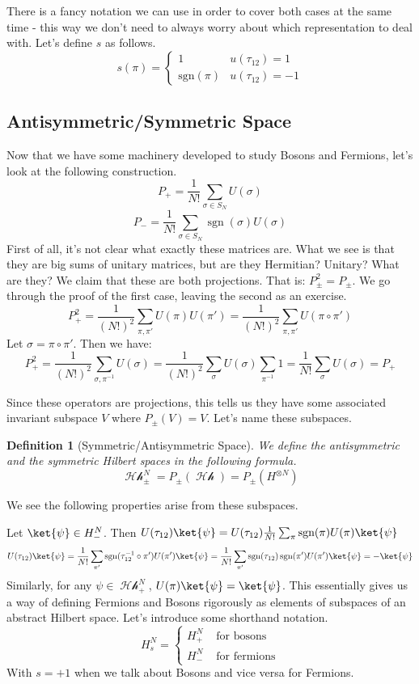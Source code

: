 \documentclass{article}
\DeclareMathOperator{\Hh}{\mathcal{Hh}}
\DeclareMathOperator{\sgn}{\textrm{sgn}}
\newtheorem{defn}{Definition}
\begin{document}
There is a fancy notation we can use in order to cover both cases at the same time - this way we don't need to always worry about which representation to deal with. Let's define $s$ as follows.
\[s(\pi)=\begin{cases}1 & u(\tau_{12})=1\\
\textrm{sgn}(\pi) & u(\tau_{12})=-1
\end{cases}\]
\pagebreak

\subsection{Antisymmetric/Symmetric Space}
Now that we have some machinery developed to study Bosons and Fermions, let's look at the following construction.
\begin{equation}
P_{+} = \frac{1}{N!}\sum_{\sigma \in S_N} U(\sigma)
\end{equation}
\begin{equation}
P_{-} = \frac{1}{N!}\sum_{\sigma \in S_N} \sgn(\sigma) U(\sigma)
\end{equation}
First of all, it's not clear what exactly these matrices are. What we see is that they are big sums of unitary matrices, but are they Hermitian? Unitary? What are they? We claim that these are both projections. That is: $P_{\pm}^2 = P_{\pm}$. We go through the proof of the first case, leaving the second as an exercise.
\[P_+^2 = \frac{1}{(N!)^2} \sum_{\pi,\pi'}U(\pi)U(\pi') = \frac{1}{(N!)^2}\sum_{\pi,\pi'} U(\pi \circ \pi')\]
Let $\sigma = \pi\circ \pi'$. Then we have:
\[P_+^2 = \frac{1}{(N!)^2} \sum_{\sigma,\pi^{-1}}U(\sigma) = \frac{1}{(N!)^2}\sum_{\sigma}U(\sigma) \sum_{\pi^{-1}}1 = \frac{1}{N!}\sum_{\sigma} U(\sigma) = P_+\]

Since these operators are projections, this tells us they have some associated invariant subspace $V$ where $P_\pm (V) = V$. Let's name these subspaces.
\begin{defn}[Symmetric/Antisymmetric Space]
We define the antisymmetric and the symmetric Hilbert spaces in the following formula.
\begin{equation}
\Hh_\pm^N = P_\pm(\Hh) = P_\pm(H^{\otimes N})
\end{equation}
\end{defn}
We see the following properties arise from these subspaces. 

Let $\ket{\psi} \in H_-^N$. Then $U(\tau_{12}) \ket{\psi} = U(\tau_{12}) \frac{1}{N!}\sum_{\pi}\sgn(\pi)U(\pi) \ket{\psi}$
\[U(\tau_{12})\ket{\psi} = \frac{1}{N!}\sum_{\pi'}\sgn(\tau_{12}^{-1}\circ \pi')U(\pi') \ket{\psi} = \frac{1}{N!}\sum_{\pi'}\sgn(\tau_{12})\sgn(\pi')U(\pi')\ket{\psi}=-\ket{\psi}\] Similarly, for any $\psi \in \Hh_+^N$, $U(\pi)\ket{\psi} = \ket{\psi}$. This essentially gives us a way of defining Fermions and Bosons rigorously as elements of subspaces of an abstract Hilbert space. Let's introduce some shorthand notation.
\[H_s^N = \begin{cases}H_+^N & \textrm{ for bosons} \\ H_-^N & \textrm{ for fermions}\end{cases}\]
With $s = +1$ when we talk about Bosons and vice versa for Fermions.
\end{document}
